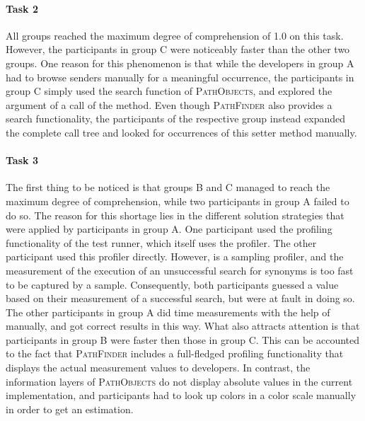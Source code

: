 \paragraph{Task 2} All groups reached the maximum degree of comprehension of 1.0 on this task.
However, the participants in group C were noticeably faster than the other two groups. 
One reason for this phenomenon is that while the developers in group A had to browse senders manually for a meaningful occurrence, the participants in group C simply used the search function of \textsc{PathObjects}, and explored the argument of a call of the  method.
Even though \textsc{PathFinder} also provides a search functionality, the participants of the respective group instead expanded the complete call tree and looked for occurrences of this setter method manually.

\paragraph{Task 3} The first thing to be noticed is that groups B and C managed to reach the maximum degree of comprehension, while two participants in group A failed to do so.
The reason for this shortage lies in the different solution strategies that were applied by participants in group A.
One participant used the profiling functionality of the test runner, which itself uses the  profiler.
The other participant used this profiler directly.
However,  is a sampling profiler, and the measurement of the execution of an unsuccessful search for synonyms is too fast to be captured by a sample.
Consequently, both participants guessed a value based on their measurement of a successful search, but were at fault in doing so.
The other participants in group A did time measurements with the help of  manually, and got correct results in this way.
What also attracts attention is that participants in group B were faster then those in group C.
This can be accounted to the fact that \textsc{PathFinder} includes a full-fledged profiling functionality that displays the actual measurement values to developers.
In contrast, the information layers of \textsc{PathObjects} do not display absolute values in the current implementation, and participants had to look up colors in a color scale manually in order to get an estimation.

